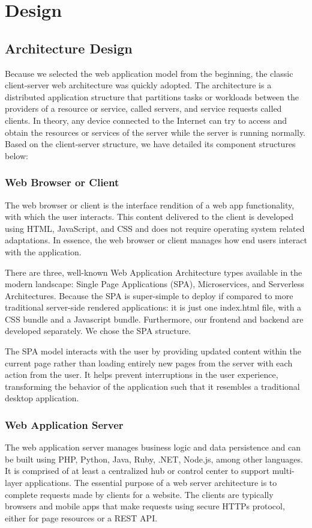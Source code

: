 \section{Design}
\label{sec:Design}

\subsection{Architecture Design}
\label{sec:Design>Architecture Design}
Because we selected the web application model from the beginning, the classic client-server web architecture was quickly adopted. The architecture is a distributed application structure that partitions tasks or workloads between the providers of a resource or service, called servers, and service requests called clients. In theory, any device connected to the Internet can try to access and obtain the resources or services of the server while the server is running normally. Based on the client-server structure, we have detailed its component structures below:

\subsubsection{Web Browser or Client}
\label{sec:Design>Architecture Design>Web Browser or Client}
The web browser or client is the interface rendition of a web app functionality, with which the user interacts. This content delivered to the client is developed using HTML, JavaScript, and CSS and does not require operating system related adaptations. In essence, the web browser or client manages how end users interact with the application.

There are three, well-known Web Application Architecture types available in the modern landscape: Single Page Applications (SPA), Microservices, and Serverless Architectures. Because the SPA is super-simple to deploy if compared to more traditional server-side rendered applications: it is just one index.html file, with a CSS bundle and a Javascript bundle. Furthermore, our frontend and backend are developed separately. We chose the SPA structure.

The SPA model interacts with the user by providing updated content within the current page rather than loading entirely new pages from the server with each action from the user. It helps prevent interruptions in the user experience, transforming the behavior of the application such that it resembles a traditional desktop application.

\subsubsection{Web Application Server}
\label{sec:Design>Architecture Design>Web Application Server}
The web application server manages business logic and data persistence and can be built using PHP, Python, Java, Ruby, .NET, Node.js, among other languages. It is comprised of at least a centralized hub or control center to support multi-layer applications. The essential purpose of a web server architecture is to complete requests made by clients for a website. The clients are typically browsers and mobile apps that make requests using secure HTTPs protocol, either for page resources or a REST API.

